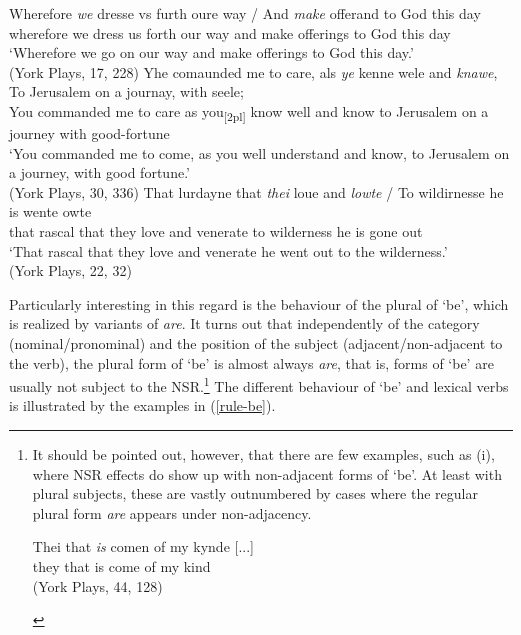 \documentclass[output=paper]{langsci/langscibook}
\begin{document}
\ea
\label{york7}
\ea \gll Wherefore \textit{we} dresse vs furth oure way / And \textit{make} offerand to God this day \\
wherefore we dress us forth our way {} and make offerings to God this day\\
\glt `Wherefore we go on our way and make offerings to God this day.'\\
(York Plays, 17, 228)
\ex  \gll Yhe comaunded me to care, als \textit{ye} kenne wele and \textit{knawe}, To Jerusalem on a journay, with seele; \\
You commanded me to care as you\textsubscript{[2pl]} know well and know to Jerusalem on a journey with good-fortune\\
\glt `You commanded me to come, as you well understand and know, to Jerusalem on a journey, with good fortune.' \\
(York Plays, 30, 336)
\ex \gll That lurdayne that \textit{thei} loue and \textit{lowte} / To wildirnesse he is wente owte\\
that rascal that they love and venerate {} to wilderness he is gone out\\
\glt `That rascal that they love and venerate he went out to the wilderness.'\\
(York Plays, 22, 32)
\z
\z

Particularly interesting in this regard is the behaviour of the plural of `be',
which is realized by variants of \emph{are}. It turns out that independently of
the category (nominal/pronominal) and the position of the subject
(adjacent\slash non-ad\-ja\-cent to the verb), the plural form of `be' is almost always
\emph{are}, that is, forms of `be' are usually not subject to the
\gls{NSR}.\footnote{It should be pointed out,
    however, that there are few examples, such as (i), where \gls{NSR} effects do show up with non-adjacent forms of `be'. At least
    with plural subjects, these are vastly outnumbered by cases where the
    regular plural form \emph{are} appears under non-adjacency.

    \begin{exe}
         \gll Thei that \textit{is} comen of my kynde [...] \\
        they that is come of my kind \\
        \glt (York Plays, 44, 128)
    \end{exe}
} The different behaviour of `be' and lexical verbs is illustrated by the examples in (\ref{rule-be}).
\end{document}
